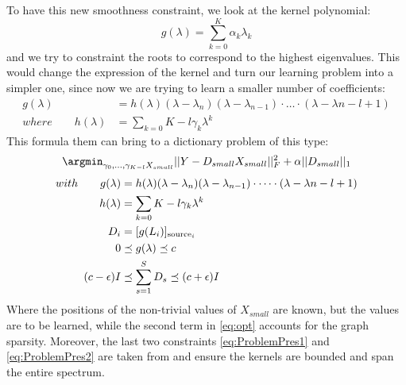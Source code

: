 To have this new smoothness constraint, we look at the kernel polynomial:
\begin{equation}
g(\lambda) = \sum_{k=0}^{K}\alpha_k \lambda_k
\end{equation}
and we try to constraint the roots to correspond to the highest eigenvalues. This would change the expression of the kernel and turn our learning problem into a simpler one, since now we are trying to learn a smaller number of coefficients:
\begin{align}
g(\lambda) &= h(\lambda)(\lambda - \lambda_n)(\lambda - \lambda_{n-1})\cdot \dots \cdot (\lambda - \lambda{n-l+1})\\
where \qquad h(\lambda) &= \sum_{k=0}{K-l}\gamma_k\lambda^{k}
\label{eq:polynom}
\end{align}
This formula them can bring to a dictionary problem of this type:
\begin{equation}
\argmin_{\gamma_0,\dots,\gamma_{K-l}X_{small}} ||Y - D_{small}X_{small}||^2_F + \alpha||D_{small}||_1
\label{eq:opt}
\end{equation}
\begin{align}
with \qquad g(\lambda) &= h(\lambda)(\lambda - \lambda_n)(\lambda - \lambda_{n-1})\cdot \dots \cdot (\lambda - \lambda{n-l+1}) \notag\\
h(\lambda) &= \sum_{k=0}{K-l}\gamma_k\lambda^{k} \notag\\
D_i &= [g(L_i)]_{\text{source}_i} \notag\\
0 &\preceq g(\lambda) \preceq c \label{eq:ProblemPres1}\\
(c-\epsilon)I &\preceq \sum_{s=1}^{S}D_s \preceq (c+\epsilon)I \label{eq:ProblemPres2}
\end{align}
Where the positions of the non-trivial values of $X_{small}$ are known, but the values are to be learned, while the second term in \autoref{eq:opt} accounts for the graph sparsity. Moreover, the last two constraints \ref{eq:ProblemPres1} and \ref{eq:ProblemPres2} are taken from \cite{Thanou2014} and ensure the kernels are bounded and span the entire spectrum.
\label{sec:DictionaryLearningSection}

